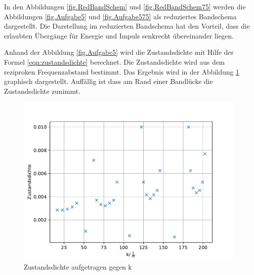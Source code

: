 In den Abbildungen \ref{fig.RedBandSchem} und \ref{fig.RedBandSchem75} werden die Abbildungen \ref{fig.Aufgabe5} und \ref{fig.Aufgabe575} als reduziertes Bandschema dargestellt.
Die Darstellung im reduzierten Bandschema hat den Vorteil, dass die erlaubten Übergänge für Energie und Impuls senkrecht übereinander liegen.

Anhand der Abbildung \ref{fig.Aufgabe5} wird die Zustandsdichte mit Hilfe der Formel \ref{eqn:zustandsdichte} berechnet.
Die Zustandsdichte wird aus dem reziproken Frequenzabstand bestimmt.
Das Ergebnis wird in der Abbildung \ref{fig.zustandsdichte} graphisch dargestellt.
Auffällig ist dass am Rand einer Bandlücke die Zustandsdichte zunimmt.


\begin{figure}[h!]
  \centering
  \includegraphics[width=\textwidth]{Zustandsdichte.pdf}
  \caption{Zustandsdichte aufgetragen gegen k}
  \label{fig.zustandsdichte}
\end{figure}
\FloatBarrier


%

